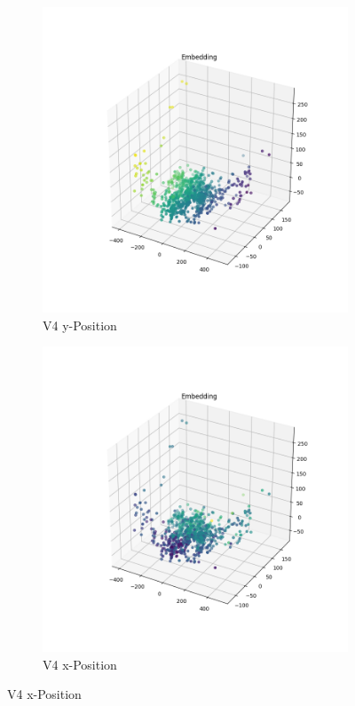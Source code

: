 	 \begin{figure}[h]
	\centering
	
		\begin{subfigure}[c]{0.49\textwidth}			
		\includegraphics[width=1\textwidth,center]{bilder/Hauptteil/MT_Grapple/EMB_alle/4_Embedding_y.png}
		\caption{V4 y-Position}
		\label{img:Einbettung4_y}	
	\end{subfigure}
	\centering
	\begin{subfigure}[c]{0.49\textwidth}			
		\includegraphics[width=1\textwidth,center]{bilder/Hauptteil/MT_Grapple/EMB_alle/4_Embedding_x.png}
		\caption{V4 x-Position}
		\label{img:Einbettung4_x}		
	\end{subfigure}


\end{figure}
